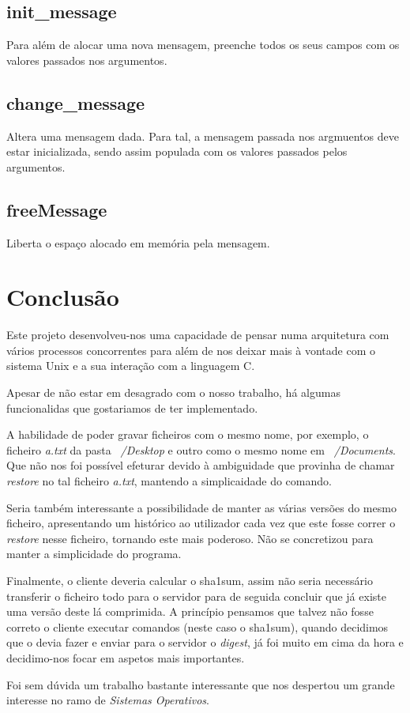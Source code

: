 \documentclass[12pt,a4paper]{report}
\begin{document}
\section{init\_message}
Para além de alocar uma nova mensagem, preenche todos os seus campos com os valores passados nos argumentos.\par

\section{change\_message}
Altera uma mensagem dada. Para tal, a mensagem passada nos argmuentos deve estar inicializada, sendo assim populada com os valores passados pelos argumentos.

\section{freeMessage}
Liberta o espaço alocado em memória pela mensagem.


\chapter{Conclusão}
Este projeto desenvolveu-nos uma capacidade de pensar numa arquitetura com vários processos concorrentes  para além de nos deixar mais à vontade com o sistema Unix e a sua interação com a linguagem C.\par
Apesar de não estar em desagrado com o nosso trabalho, há algumas funcionalidas que gostariamos de ter implementado.\par
A habilidade de poder gravar ficheiros com o mesmo nome, por exemplo, o ficheiro \emph{a.txt} da pasta \emph{~/Desktop} e outro como o mesmo nome em \emph{~/Documents}. Que não nos foi possível efeturar devido à ambiguidade que provinha de chamar \emph{restore} no tal ficheiro \emph{a.txt}, mantendo a simplicaidade do comando.\par
Seria também interessante a possibilidade de manter as várias versões do mesmo ficheiro, apresentando um histórico ao utilizador cada vez que este fosse correr o \emph{restore} nesse ficheiro, tornando este mais poderoso. Não se concretizou para manter a simplicidade do programa.\par
Finalmente, o cliente deveria calcular o sha1sum, assim não seria necessário transferir o ficheiro todo para o servidor para de seguida concluir que já existe uma versão deste lá comprimida. A princípio pensamos que talvez não fosse correto o cliente executar comandos (neste caso o sha1sum), quando decidimos que o devia fazer e enviar para o servidor o \emph{digest}, já foi muito em cima da hora e decidimo-nos focar em aspetos mais importantes.\par
Foi sem dúvida um trabalho bastante interessante que nos despertou um grande interesse no ramo de \emph{Sistemas Operativos}.
\end{document}
